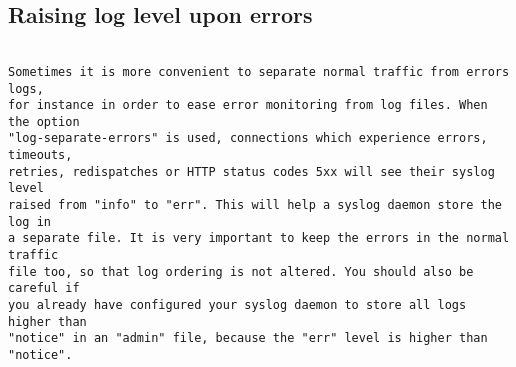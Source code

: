 
\subsection{Raising log level upon errors}

\begin{verbatim}

Sometimes it is more convenient to separate normal traffic from errors logs,
for instance in order to ease error monitoring from log files. When the option
"log-separate-errors" is used, connections which experience errors, timeouts,
retries, redispatches or HTTP status codes 5xx will see their syslog level
raised from "info" to "err". This will help a syslog daemon store the log in
a separate file. It is very important to keep the errors in the normal traffic
file too, so that log ordering is not altered. You should also be careful if
you already have configured your syslog daemon to store all logs higher than
"notice" in an "admin" file, because the "err" level is higher than "notice".


\end{verbatim}
